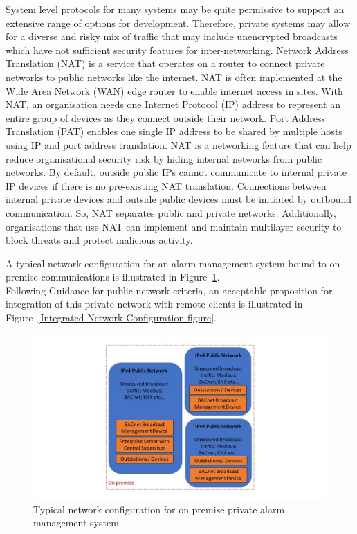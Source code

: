 \documentclass[11pt, oneside]{book}   	%
\begin{document}
System level protocols for many systems may be quite permissive to support an extensive range of options for development.
Therefore, private systems may allow for a diverse and risky mix of traffic that may include unencrypted broadcasts which have not sufficient security features for inter-networking.
Network Address Translation (NAT) is a service that operates on a router to connect private networks to public networks like the internet.
NAT is often implemented at the Wide Area Network (WAN) edge router to enable internet access in sites.
With NAT, an organisation needs one Internet Protocol (IP) address to represent an entire group of devices as they connect outside their network.
Port Address Translation (PAT) enables one single IP address to be shared by multiple hosts using IP and port address translation.
NAT is a networking feature that can help reduce organisational security risk by hiding internal networks from public networks.
By default, outside public IPs cannot communicate to internal private IP devices if there is no pre-existing NAT translation.
Connections between internal private devices and outside public devices must be initiated by outbound communication.
So, NAT separates public and private networks.
Additionally, organisations that use NAT can implement and maintain multilayer security to block threats and protect malicious activity.

A typical network configuration for an alarm management system bound to on-premise communications is illustrated in Figure~\ref{Typical Network Configuration figure}.\\
Following Guidance for public network criteria, an acceptable proposition for integration of this private network with remote clients is illustrated in Figure~\ref{Integrated Network Configuration figure}.

\pagebreak

\FloatBarrier
\begin{figure}
\begin{center}
\includegraphics[width=1\textwidth]{typicalPrivateNetwork.jpg}
\caption{Typical network configuration for on premise private alarm management system}
\label{Typical Network Configuration figure}
\end{center}
\end{figure}
\FloatBarrier
\end{document}
